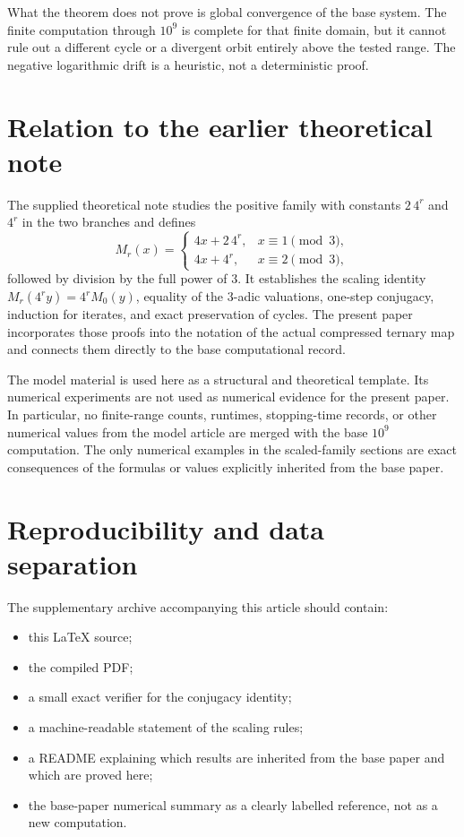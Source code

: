 \documentclass[11pt]{article}
\begin{document}
What the theorem does not prove is global convergence of the base system. The finite computation through $10^9$ is complete for that finite domain, but it cannot rule out a different cycle or a divergent orbit entirely above the tested range. The negative logarithmic drift is a heuristic, not a deterministic proof.

\section{Relation to the earlier theoretical note}
The supplied theoretical note studies the positive family with constants $2\,4^r$ and $4^r$ in the two branches and defines
\[
M_r(x)=
\begin{cases}
4x+2\,4^r,&x\equiv1\pmod3,\\
4x+4^r,&x\equiv2\pmod3,
\end{cases}
\]
followed by division by the full power of $3$. It establishes the scaling identity $M_r(4^ry)=4^rM_0(y)$, equality of the $3$-adic valuations, one-step conjugacy, induction for iterates, and exact preservation of cycles. The present paper incorporates those proofs into the notation of the actual compressed ternary map and connects them directly to the base computational record.

The model material is used here as a structural and theoretical template. Its numerical experiments are not used as numerical evidence for the present paper. In particular, no finite-range counts, runtimes, stopping-time records, or other numerical values from the model article are merged with the base $10^9$ computation. The only numerical examples in the scaled-family sections are exact consequences of the formulas or values explicitly inherited from the base paper.

\section{Reproducibility and data separation}
The supplementary archive accompanying this article should contain:
\begin{itemize}
\item this LaTeX source;
\item the compiled PDF;
\item a small exact verifier for the conjugacy identity;
\item a machine-readable statement of the scaling rules;
\item a README explaining which results are inherited from the base paper and which are proved here;
\item the base-paper numerical summary as a clearly labelled reference, not as a new computation.
\end{itemize}
\end{document}
